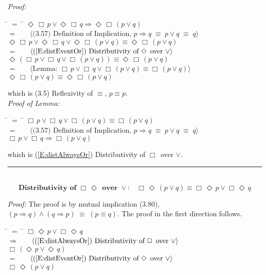 \documentclass[fleqn, leqno]{article}
\newcommand{\lgap}{2pt}                             %
\newcommand{\mymathindent}{24pt}                    %
\newcommand{\equivs}{\ensuremath{\;\equiv\;}}       %
\newcommand{\impl}{\ensuremath{\Rightarrow}}        %
\newcommand{\Event}{\Diamond\,}
\newcommand{\Always}{\Box\,}
\newcommand{\myqed}{\hfill\rule[-.23ex]{1.2ex}{2.0ex}}
\newcommand{\Gll} {\langle}                         %
\newcommand{\Ggg} {\rangle}                         %
\newcommand{\Hint}[1]     {\ \ \ $\Gll              \mbox{#1} \Ggg$ }   %
\begin{document}
\emph{Proof:}
\begin{tabbing}
\hspace{\mymathindent} \= $= \;$ \= \kill
  \> \>   $\Event\Always p \lor \Event\Always q \impl \Event\Always(p \lor q)$\\[\lgap]
  \> $=$  \>  \Hint{(3.57) Definition of Implication, $p\impl q \equivs p\lor q \equivs q$}\\[\lgap]
  \> \>   $\Event\Always p \lor \Event\Always q \lor \Event\Always(p \lor q) \equiv \Event\Always(p \lor q)$\\[\lgap]
  \> $=$  \>  \Hint{(\ref{E:distEventOr}) Distributivity of $\Event$ over $\lor$}\\[\lgap]
  \> \>   $\Event(\Always p \lor \Always q \lor \Always(p \lor q)) \equiv \Event\Always(p \lor q)$\\[\lgap]
  \> $=$  \>  \Hint{Lemma: $\Always p \lor \Always q \lor \Always(p \lor q) \equiv \Always(p \lor q)$}\\[\lgap]
  \> \>   $\Event\Always(p \lor q) \equiv \Event\Always(p \lor q)$
\end{tabbing}
which is (3.5) Reflexivity of $\equiv$, $p\equiv p$.\\[\lgap]

\emph{Proof of Lemma:}
\begin{tabbing}
\hspace{\mymathindent} \= $= \;$ \= \kill
  \> \>   $\Always p \lor \Always q \lor \Always(p \lor q) \equiv \Always(p \lor q)$\\[\lgap]
  \> $=$  \>  \Hint{(3.57) Definition of Implication, $p\impl q \equivs p\lor q \equivs q$}\\[\lgap]
  \> \>   $\Always p \lor \Always q \impl \Always(p \lor q)$
\end{tabbing}
which is (\ref{E:distAlwaysOr}) Distributivity of $\Always$ over $\lor$. \myqed\\[\lgap]

\begin{equation}\label{E:distAlwaysEventOr}
\textbf{Distributivity of $\Always\Event$ over $\lor$:}\quad \Always\Event(p \lor q) \equiv \Always\Event p \lor \Always\Event q
\end{equation}

\emph{Proof:} The proof is by mutual implication (3.80), $(p\impl q) \land (q\impl p) \equivs (p\equiv q)$.
The proof in the first direction follows.
\begin{tabbing}
\hspace{\mymathindent} \= $= \;$ \= \kill
  \> \>   $\Always\Event p \lor \Always\Event q$\\[\lgap]
  \> $\impl$  \>  \Hint{(\ref{E:distAlwaysOr}) Distributivity of $\Always$ over $\lor$}\\[\lgap]
  \> \>   $\Always(\Event p \lor \Event q)$\\[\lgap]
  \> $=$  \>  \Hint{(\ref{E:distEventOr}) Distributivity of $\Event$ over $\lor$}\\[\lgap]
  \> \>   $\Always\Event(p \lor q)$\\[\lgap]
\end{tabbing}
\end{document}
